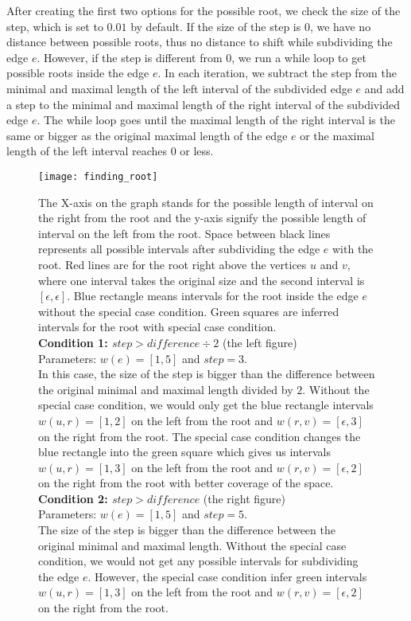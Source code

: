After creating the first two options for the possible root, we check the size of the step, which is set to $0.01$ by default. If the size of the step is $0$, we have no distance between possible roots, thus no distance to shift while subdividing the edge $e$. However, if the step is different from $0$, we run a while loop to get possible roots inside the edge $e$. In each iteration, we subtract the step from the minimal and maximal length of the left interval of the subdivided edge $e$ and add a step to the minimal and maximal length of the right interval of the subdivided edge $e$. The while loop goes until the maximal length of the right interval is the same or bigger as the original maximal length of the edge $e$ or the maximal length of the left interval reaches $0$ or less.

\begin{figure}[ht!]
	\centering
	\label{finding_root}
  	\texttt{[image: finding\_root]}
  	\caption[Rooting the gene tree: special case condition]
  	{The X-axis on the graph stands for the possible length of interval on the right from the root and the y-axis signify the possible length of interval on the left from the root. Space between black lines represents all possible intervals after subdividing the edge $e$ with the root. Red lines are for the root right above the vertices $u$ and $v$, where one interval takes the original size and the second interval is $[\epsilon, \epsilon]$. Blue rectangle means intervals for the root inside the edge $e$ without the special case condition. Green squares are inferred intervals for the root with special case condition. \\
  	\textbf{Condition 1: $step > difference \div 2$} (the left figure)\\
  	Parameters: $w(e) = [1, 5]$ and $step = 3$. \\
  	In this case, the size of the step is bigger than the difference between the original minimal and maximal length divided by $2$. Without the special case condition, we would only get the blue rectangle intervals $w(u,r)=[1,2]$ on the left from the root and $w(r,v)=[\epsilon, 3]$ on the right from the root. The special case condition changes the blue rectangle into the green square which gives us intervals $w(u, r) = [1, 3]$ on the left from the root and $w(r, v) = [\epsilon, 2]$ on the right from the root with better coverage of the space.\\
  	\textbf{Condition 2: $step > difference$} (the right figure)\\
  	Parameters: $w(e) = [1, 5]$ and $step = 5$. \\
  	The size of the step is bigger than the difference between the original minimal and maximal length. Without the special case condition, we would not get any possible intervals for subdividing the edge $e$. However, the special case condition infer green intervals $w(u, r) = [1, 3]$ on the left from the root and $w(r, v) = [\epsilon, 2]$ on the right from the root.}
\end{figure}

